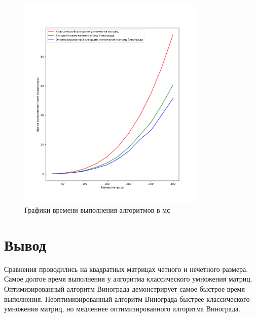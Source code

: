 \clearpage

\begin{figure}[h]
    \centering
    \includegraphics[width=0.8\textwidth]{images/Figure_1}
    \caption{Графики времени выполнения алгоритмов в мс}
    \label{fig:images-Figure_1}
\end{figure}

\section{Вывод}

Сравнения проводились на квадратных матрицах четного и нечетного размера.
Самое долгое время выполнения у алгоритма классического умножения матриц.
Оптимизированный алгоритм Винограда демонстрирует самое быстрое время выполнения.
Неоптимизированный алгоритм Винограда быстрее классического умножения матриц,
но медленнее оптимизированного алгоритма Винограда.

